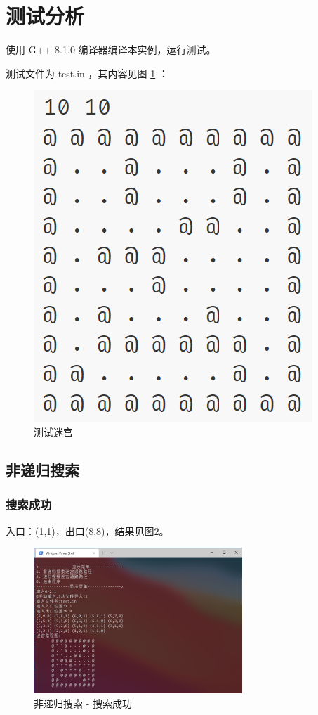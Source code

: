 \documentclass{ctexart}
\begin{document}
    \section{测试分析}

    使用 G++ 8.1.0 编译器编译本实例，运行测试。

    测试文件为 test.in ，其内容见图 \ref{img:maze} ：

    \begin{figure}[h]
        \centering
        \includegraphics{迷宫.png}
        \caption{测试迷宫}
        \label{img:maze}
    \end{figure}

    \subsection{非递归搜索}
    \subsubsection{搜索成功}
    
    入口：(1,1)，出口(8,8)，结果见图\ref{img:test1}。

    \begin{figure}[h]
        \centering
        \includegraphics[width=0.7\textwidth]{测试结果1.png}
        \caption{非递归搜索 - 搜索成功}
        \label{img:test1}
    \end{figure}
\end{document}
